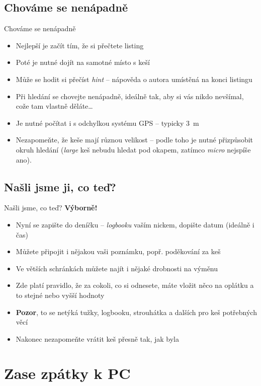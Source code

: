 \documentclass{beamer}
\begin{document}
	\subsection{Chováme se nenápadně}
	\begin{frame}{Chováme se nenápadně}
		\begin{itemize}
			\item Nejlepší je začít tím, že si přečtete listing
			\item Poté je nutné dojít na samotné místo s keší
			\item Může se hodit si přečíst \emph{hint} -- nápověda o autora umístěná na konci listingu
			\item Při hledání se chovejte nenápadně, ideálně tak, aby si vás nikdo nevšímal, cože tam vlastně děláte\dots
			\item Je nutné počítat i s odchylkou systému GPS -- typicky 3~m
			\item Nezapomeňte, že keše mají různou velikost -- podle toho je nutné přizpůsobit okruh hledání (\emph{large} keš nebudu hledat pod okapem, zatímco \emph{micro} nejspíše ano).
		\end{itemize}
	\end{frame}
	

	
	\subsection{Našli jsme ji, co teď?}
	\begin{frame}{Našli jsme, co teď?}
		\textbf{Výborně!}
		\begin{itemize}
			\item Nyní se zapište do deníčku -- \emph{logbooku} vaším nickem, dopište datum (ideálně i čas)
			\item Můžete připojit i nějakou vaši poznámku, popř. poděkování za keš
			\item Ve větších schránkách můžete najít i nějaké drobnosti na výměnu
			\item Zde platí pravidlo, že za cokoli, co si odnesete, máte vložit něco na oplátku a to stejné nebo vyšší hodnoty
			\item \textbf{Pozor}, to se netýká tužky, logbooku, strouhátka a dalších pro keš potřebných věcí
			\item Nakonec nezapomeňte vrátit keš přesně tak, jak byla
		\end{itemize}
	\end{frame}
	
	\section{Zase zpátky k PC}
\end{document}
